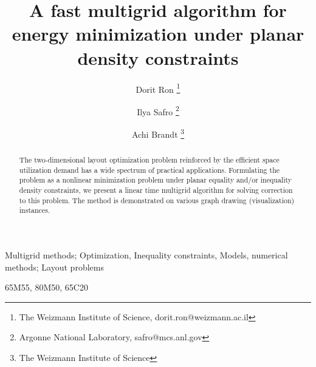 \documentclass[final]{siamltex}
\title{A fast multigrid algorithm for energy minimization under planar
density constraints}
\author{Dorit Ron \thanks{The Weizmann Institute of Science, dorit.ron@weizmann.ac.il} \and Ilya Safro
\thanks{Argonne National Laboratory, safro@mcs.anl.gov} \and  Achi Brandt
\thanks{The Weizmann Institute of Science} }
\begin{document}
\maketitle
\begin{abstract}
The two-dimensional layout optimization problem reinforced by the
efficient space utilization demand has a wide spectrum of
practical applications. Formulating the problem as a nonlinear
minimization problem under planar equality and/or inequality
density constraints, we present a linear time multigrid algorithm
for solving correction to this problem. The method is demonstrated
on various graph drawing (visualization) instances.



\end{abstract}
\begin{keywords}
Multigrid methods; Optimization, Inequality constraints, Models,
numerical methods; Layout problems
\end{keywords}

\begin{AMS}
65M55, 80M50, 65C20
\end{AMS}

\pagestyle{myheadings}
\thispagestyle{plain}







\newcommand{\solution}{\par\noindent{\bf Solution:}\quad}
\newcommand{\minla}{Minimum Linear Arrangement problem }



\newcommand{\genr}{\mathfrak{E}}
\newcommand{\geqd}{\mathfrak{eqd}}


\newcommand{\eqd}{\mathfrak{eqd}}
\newcommand{\gr}{\mathcal{G}}
\newcommand{\nar}{\mathfrak{a}}
\newcommand{\wnd}{\mathcal{W}}
\newcommand{\pgr}{\mathcal{P}(\mathcal{G})}
\newcommand{\sgr}{\mathcal{S}(\mathcal{G})}
\newcommand{\bgr}{\mathcal{B}(\mathcal{G})}
\newcommand{\bwn}{\overline{\mathcal{B}}(\mathcal{W})}
\newcommand{\bpwn}{\mathcal{B}(\mathcal{W})}
\newcommand{\bugr}{\mathcal{B}_u(\mathcal{G})}
\newcommand{\bvgr}{\mathcal{B}_v(\mathcal{G})}
\newcommand{\ar}{\mathcal{A}}
\newcommand{\ineigh}{\mathcal{P}_i}
\newcommand{\jneigh}{\mathcal{P}_j}
\newcommand{\sar}{\Upsilon}
\newcommand{\mar}{\upsilon}
\newcommand{\mdl}[1]{\text{(mod }#1\text{)}}\newcommand{\Lag}{\mathfrak{L}}
\newcommand{\bu}{{\bf u}}
\newcommand{\bU}{{\bf U}}
\newcommand{\bpgr}{\bold{\mathcal{P}}_{\bu}}
\newcommand{\bpgrw}{\bold{\mathcal{P}}_{\bu_{\wnd}}}
\newcommand{\bpw}{\bold{\mathcal{P}}_{\wnd}}
\end{document}

